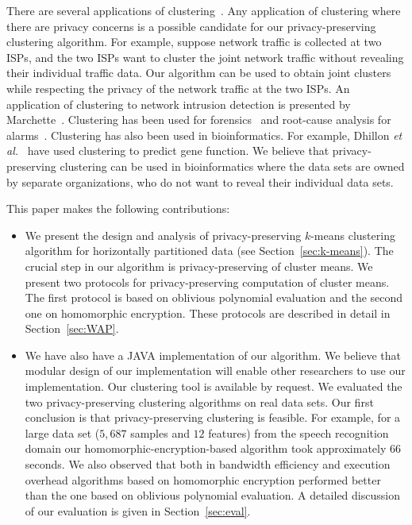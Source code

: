 
There are several applications of
clustering~\cite{pattern-classification}. Any application of
clustering where there are privacy concerns is a possible candidate
for our privacy-preserving clustering algorithm. For example, suppose
network traffic is collected at two ISPs, and the two ISPs want to
cluster the joint network traffic without revealing their individual
traffic data. Our algorithm can be used to obtain joint clusters while
respecting the privacy of the network traffic at the two ISPs. An
application of clustering to network intrusion detection is presented
by Marchette~\cite{Marchette99}.  Clustering has been used for
forensics~\cite{Pouget:Dacier} and root-cause analysis for
alarms~\cite{Julisch:TISSEC}. Clustering has also been used in
bioinformatics. For example, Dhillon {\it et al.}~\cite{Dhillon:Bio}
have used clustering to predict gene function. We believe that
privacy-preserving clustering can be used in bioinformatics where the
data sets are owned by separate organizations, who do not want to
reveal their individual data sets.

This paper makes the following contributions:

\begin{itemize}
\item We present the design and analysis of privacy-preserving $k$-means
clustering algorithm for horizontally partitioned data (see
Section~\ref{sec:k-means}). The crucial step in our algorithm is
privacy-preserving of cluster means. We present two protocols for
privacy-preserving computation of cluster means. The first protocol is
based on oblivious polynomial evaluation and the second one on
homomorphic encryption. These protocols are described in detail in
Section~\ref{sec:WAP}.

\item We have also have a JAVA implementation of our algorithm. 
We believe that modular design of our implementation will enable other
researchers to use our implementation. Our clustering tool is
available by request.  We evaluated the two privacy-preserving
clustering algorithms on real data sets. Our first conclusion is that
privacy-preserving clustering is feasible. For example, for a large
data set ($5,687$ samples and $12$ features) from the speech
recognition domain our homomorphic-encryption-based algorithm took
approximately $66$ seconds. We also observed that both in bandwidth
efficiency and execution overhead algorithms based on homomorphic
encryption performed better than the one based on oblivious polynomial
evaluation. A detailed discussion of our evaluation is given in
Section~\ref{sec:eval}.

\end{itemize}






